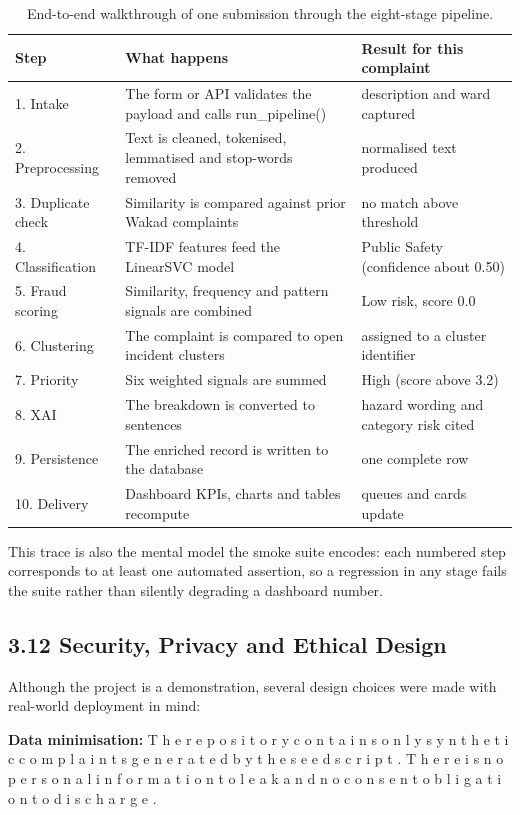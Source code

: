 \documentclass[10pt,letterpaper,oneside]{article}\usepackage{geometry}\geometry{top=1in,bottom=1in,left=1in,right=1in,includeheadfoot}\usepackage{xcolor}\definecolor{color@navy}{HTML}{1F3B63}\definecolor{color@grey}{HTML}{404040}\definecolor{color@hdr}{HTML}{F2F4F7}\usepackage{titlesec}\titleformat{\section}  {\normalfont\huge\bfseries\color@navy}  {}{0pt}{\MakeUppercase}\titleformat{\subsection}  {\normalfont\Large\bfseries\color@navy}  {}{0pt}{}\titleformat{\subsubsection}  {\normalfont\large\bfseries\color@navy}  {}{0pt}{}\titlespacing*{\section}{0pt}{14pt}{6pt}\titlespacing*{\subsection}{0pt}{10pt}{4pt}\titlespacing*{\subsubsection}{0pt}{8pt}{3pt}\setlength{\parindent}{0pt}\setlength{\parskip}{0.6em}\parindent=0pt\usepackage{enumitem}\setlist{nosep,leftmargin=*,itemsep=0pt,topsep=2pt,partopsep=0pt}\usepackage{array}\usepackage{booktabs}\usepackage{caption}\captionsetup{font={small,it},labelfont={bf},labelsep=period,  parskip=2pt,skip=4pt,list=no}\captionsetup[table]{labelfont={bf,small,color@navy},name=Table}\usepackage{graphicx}\usepackage{verbatim}\usepackage{ragged2e}\usepackage{longtable}\usepackage{tabularx}\usepackage{multirow}\usepackage{colortbl}\definecolor{rowshade}{HTML}{F2F4F7}\usepackage{tikz}\usetikzlibrary{positioning,calc}\usepackage[hidelinks]{hyperref}\hypersetup{colorlinks=true,linkcolor=color@navy,urlcolor=color@navy}\pagestyle{fancy}\fancyhf{}\renewcommand{\headrulewidth}{0.4pt}\fancyhead[L]{\small\color@navy CivicSense — Project Report}\fancyhead[R]{\small\color@grey October 11, 2026}\fancyfoot[C]{\small\color@grey An Integrated Intelligent Triage Pipelin}\fancyfoot[R]{\small\color@grey Page \thepage}\usepackage{setspace}\setstretch{1.15}\AtBeginDocument{  \hypersetup{pdftitle={An Integrated Intelligent Triage Pipeline for AI-Enhanced Citizen Complaint Management},    pdfauthor={CivicSense Project Team},    pdfsubject={Project Report},    pdfkeywords={smart cities, NLP, complaint management, e-governance},    pdfcreator={CivicSense Project Team}  }}
\begin{document}
\begin{table}[htbp]
\centering
\small
\begin{tabular}{@{}lll@{}}
\toprule
Step & What happens & Result for this complaint \\
\midrule
1. Intake & The form or API validates the payload and calls run\_pipeline() & description and ward captured \\
2. Preprocessing & Text is cleaned, tokenised, lemmatised and stop-words removed & normalised text produced \\
3. Duplicate check & Similarity is compared against prior Wakad complaints & no match above threshold \\
4. Classification & TF-IDF features feed the LinearSVC model & Public Safety (confidence about 0.50) \\
5. Fraud scoring & Similarity, frequency and pattern signals are combined & Low risk, score 0.0 \\
6. Clustering & The complaint is compared to open incident clusters & assigned to a cluster identifier \\
7. Priority & Six weighted signals are summed & High (score above 3.2) \\
8. XAI & The breakdown is converted to sentences & hazard wording and category risk cited \\
9. Persistence & The enriched record is written to the database & one complete row \\
10. Delivery & Dashboard KPIs, charts and tables recompute & queues and cards update \\
\bottomrule
\end{tabular}
\caption{End-to-end walkthrough of one submission through the eight-stage pipeline.}
\end{table}

This trace is also the mental model the smoke suite encodes: each numbered step corresponds to at least one automated assertion, so a regression in any stage fails the suite rather than silently degrading a dashboard number.

\subsection*{3.12 Security, Privacy and Ethical Design}
Although the project is a demonstration, several design choices were made with real-world deployment in mind:

\item \textbf{Data minimisation: } T h e   r e p o s i t o r y   c o n t a i n s   o n l y   s y n t h e t i c   c o m p l a i n t s   g e n e r a t e d   b y   t h e   s e e d   s c r i p t .   T h e r e   i s   n o   p e r s o n a l   i n f o r m a t i o n   t o   l e a k   a n d   n o   c o n s e n t   o b l i g a t i o n   t o   d i s c h a r g e .
\end{document}
